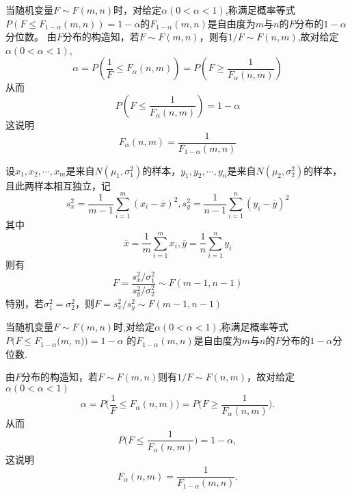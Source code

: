     当随机变量$F\sim F(m,n)$时，对给定$\alpha(0<\alpha<1)$,称满足概率等式$P(F\leq F_{1-\alpha}(m,n))=1-\alpha$的$F_{1-\alpha}(m,n)$是自由度为$m$与$n$的$F$分布的$1-\alpha$分位数。
    由$F$分布的构造知，若$F \sim F(m,n)$，则有$1/F \sim F(n,m)$,故对给定$\alpha(0<\alpha<1)$,
    $$
        \alpha = P\left(\frac{1}{F}\leq F_{\alpha}(n,m)\right)=P\left(F \geq \frac{1}{F_{\alpha}(n,m)} \right)
    $$
    从而
    $$
        P\left(F \leq \frac{1}{F_{\alpha}(n,m)}\right)=1-\alpha
    $$
    这说明
    $$
        F_{\alpha}(n,m)=\frac{1}{F_{1-\alpha}(m,n)}
    $$

    \begin{corollary}[正态总体的抽样分布]\label{cor:5.4.1}
        设$x_1,x_2,\cdots,x_m$是来自$N(\mu_1,\sigma_1^2)$的样本，$y_1,y_2,\cdots,y_n$是来自$N(\mu_2,\sigma_2^2)$的样本，且此两样本相互独立，记
        $$
            s_x^2 = \frac{1}{m-1}\sum_{i=1}^{m}(x_i-\overline{x})^2,s_y^2 = \frac{1}{n-1}\sum_{i=1}^{n}(y_i-\overline{y})^2
        $$
        其中
        $$
            \overline{x}= \frac{1}{m}\sum_{i=1}^{m}x_i,\overline{y}= \frac{1}{n}\sum_{i=1}^{n}y_i
        $$
        则有
        $$
            F=\frac{s_x^2/\sigma_1^2}{s_y^2/\sigma_2^2} \sim F(m-1,n-1)
        $$
        特别，若$\sigma_1^2=\sigma_2^2$，则$F=s_x^2/s_y^2 \sim F(m-1,n-1)$
    \end{corollary}
    当随机变量$F\sim F(m,n)$时,对给定$\alpha(0<\alpha<1)$,称满足概率等式 $P(F\leq F_{1-\alpha}(m$, $n))=1-\alpha$ 的$F_{1-\alpha}(m,n)$是自由度为$m$与$n$的$F$分布的$1-\alpha$分位数.

    由$F$分布的构造知，若$F\sim F(m,n)$则有$1/F\sim F(n,m)$，故对给定$\alpha(0<\alpha<1)$
    $$\alpha=P\Big(\frac{1}{F}\leq F_{\alpha}(n,m)\Big)=P\Big(F\geq\frac{1}{F_{\alpha}(n,m)}\Big).$$
    从而
    $$P\Big(F\leqslant\frac{1}{F_{\alpha}(n,m)}\Big)=1-\alpha,$$
    这说明
    $$F_{\alpha}(n,m)=\frac{1}{F_{1-\alpha}(m,n)}.$$


